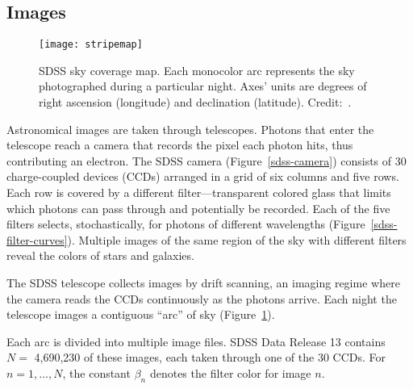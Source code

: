\subsection{Images}
\label{images}

\begin{figure}
\begin{floatrow}
\end{floatrow}
\end{figure}


\begin{figure}[t]
\texttt{[image: stripemap]}
\caption{SDSS sky coverage map. Each monocolor arc represents the sky
photographed during a particular night. Axes' units are degrees of right ascension (longitude) and declination (latitude). Credit:~\cite{sdsscoverage}.}
\label{sdss_coverage}
\end{figure}

Astronomical images are taken through telescopes.
Photons that enter the telescope reach a camera that records the pixel each photon hits,
thus contributing an electron.
The SDSS camera (Figure~\ref{sdss-camera}) consists of 30 charge-coupled devices (CCDs) arranged in a grid of six columns and five rows.
Each row is covered by a different filter---transparent colored glass that limits which photons can pass through and potentially be recorded.
Each of the five filters selects, stochastically, for photons of different wavelengths (Figure~\ref{sdss-filter-curves}).
Multiple images of the same region of the sky with different filters reveal the colors of stars and galaxies.

The SDSS telescope collects images by drift scanning, an imaging regime where the camera reads the CCDs continuously as the photons arrive.
Each night the telescope images a contiguous ``arc'' of sky (Figure~\ref{sdss_coverage}).

Each arc is divided into multiple image files.
SDSS Data Release 13 contains $N=$ 4,690,230 of these images, each taken through one of the 30 CCDs.
For $n=1,\ldots,N$, the constant $\beta_n$ denotes the filter color for image $n$.

